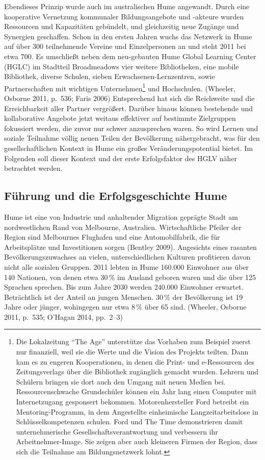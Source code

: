 \documentclass[a4paper,
fontsize=11pt,
oneside,
numbers=noperiodatend,
parskip=half-,
bibliography=totoc,
final
]{scrartcl}
\begin{document}
Ebendieses Prinzip wurde auch im australischen Hume angewandt. Durch
eine kooperative Vernetzung kommunaler Bildungsangebote und -akteure
wurden Ressourcen und Kapazitäten gebündelt, und gleichzeitig neue
Zugänge und Synergien geschaffen. Schon in den ersten Jahren wuchs das
Netzwerk in Hume auf über 300 teilnehmende Vereine und Einzelpersonen an
und steht 2011 bei etwa 700. Es umschließt neben dem neu-gebauten Hume
Global Learning Center (HGLC) im Stadtteil Broadmeadows vier weitere
Bibliotheken, eine mobile Bibliothek, diverse Schulen, sieben
Erwachsenen-Lernzentren, sowie Partnerschaften mit wichtigen
Unternehmen\footnote{Die Lokalzeitung \enquote{The Age} unterstütze das
  Vorhaben zum Beispiel zuerst nur finanziell, weil sie die Werte und
  die Vision des Projekts teilten. Dann kam es zu engeren Kooperationen,
  in denen die Print- und e-Ressourcen des Zeitungsverlags über die
  Bibliothek zugänglich gemacht wurden. Lehrern und Schülern bringen sie
  dort auch den Umgang mit neuen Medien bei. Ressourcenschwache
  Grundschüler können ein Jahr lang einen Computer mit Internetzugang
  gesponsert bekommen. Motorenhersteller Ford betreibt ein
  Mentoring-Programm, in dem Angestellte einheimische
  Langzeitarbeitslose in Schlüsselkompetenzen schulen. Ford und The Time
  demonstrieren damit unternehmerische Gesellschaftsverantwortung und
  verbessern ihr Arbeitnehmer-Image. Sie zeigen aber auch kleineren
  Firmen der Region, dass sich die Teilnahme am Bildungsnetzwerk lohnt.}
und Hochschulen. (Wheeler, Osborne 2011, p.~536; Faris 2006)
Entsprechend hat sich die Reichweite und die Erreichbarkeit aller
Partner vergrößert. Darüber hinaus können bestehende und kollaborative
Angebote jetzt weitaus effektiver auf bestimmte Zielgruppen fokussiert
werden, die zuvor nur schwer anzusprechen waren. So wird Lernen und
soziale Teilnahme völlig neuen Teilen der Bevölkerung nähergebracht, was
für den gesellschaftlichen Kontext in Hume ein großes
Veränderungspotential bietet. Im Folgenden soll dieser Kontext und der
erste Erfolgsfaktor des HGLV näher betrachtet werden.

\hypertarget{fuxfchrung-und-die-erfolgsgeschichte-hume}{%
\subsection*{Führung und die Erfolgsgeschichte
Hume}\label{fuxfchrung-und-die-erfolgsgeschichte-hume}}

Hume ist eine von Industrie und anhaltender Migration geprägte Stadt am
nordwestlichen Rand von Melbourne, Australien. Wirtschaftliche Pfeiler
der Region sind Melbournes Flughafen und eine Automobilfabrik, die für
Arbeitsplätze und Investitionen sorgen (Bentley 2009). Angesichts eines
rasanten Bevölkerungszuwachses an vielen, unterschiedlichen Kulturen
profitieren davon nicht alle sozialen Gruppen. 2011 lebten in Hume
160.000 Einwohner aus über 140 Nationen, von denen etwa 30\,\% im
Ausland geboren waren und die über 125 Sprachen sprechen. Bis zum Jahre
2030 werden 240.000 Einwohner erwartet. Beträchtlich ist der Anteil an
jungen Menschen. 30\,\% der Bevölkerung ist 19 Jahre oder jünger,
wohingegen nur etwa 8\,\% über 65 sind. (Wheeler, Osborne 2011, p.~535;
O'Hagan 2014, pp.~2--3)
\end{document}

